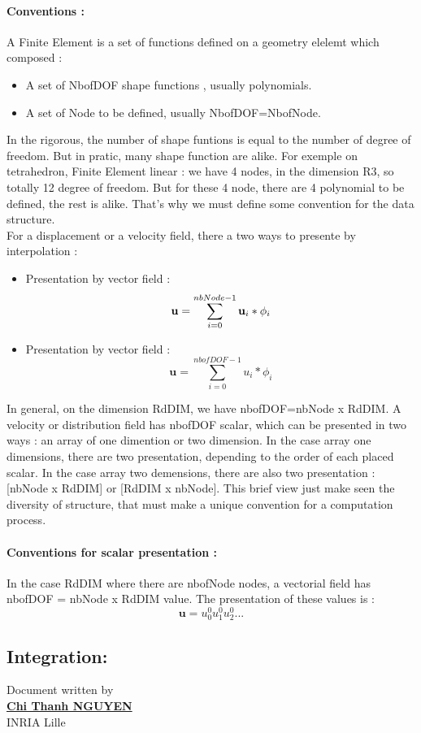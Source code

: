 \documentclass[a4paper,10pt]{article}
\begin{document}
\paragraph{Conventions : } A Finite Element is a set of functions defined on a geometry elelemt which composed :
\begin{itemize}
\item A set of NbofDOF shape functions , usually polynomials.
\item A set of Node to be defined, usually NbofDOF=NbofNode. 
\end{itemize} 
In the rigorous, the number of shape funtions is equal to the number of degree of freedom. But in pratic, many shape function are alike. For exemple on tetrahedron, Finite Element linear : we have 4 nodes, in the dimension R3, so totally 12 degree of freedom. But for these 4 node, there are 4 polynomial to be defined, the rest is alike. That's why we must define some convention for the data structure. \\
For a displacement or a velocity field, there a two ways to presente by interpolation :
\begin{itemize}
\item Presentation by vector field : 
               \[\textbf{u}=\sum_{i=0}^{nbNode-1} \textbf{u}_i * {\bf\phi}_i  \]
\item Presentation by vector field : 
               \[\textbf{u}=\sum_{i=0}^{nbofDOF-1} u_i * \phi_i  \]
\end{itemize} 
In general, on the dimension RdDIM, we have nbofDOF=nbNode x RdDIM. A velocity or distribution field has nbofDOF scalar, which can be presented in two ways : an array of one dimention or two dimension. In the case array one dimensions, there are two presentation, depending to the order of each placed scalar. In the case array two demensions, there are also two presentation :   [nbNode x RdDIM] or [RdDIM x nbNode]. This brief view just make seen the diversity of structure, that must make a unique convention for a computation process. 
\paragraph{Conventions for scalar presentation : }
In the case RdDIM where there are nbofNode nodes, a vectorial field has nbofDOF = nbNode x RdDIM  value. The presentation of these values is :
               \[ \textbf{u}= u_0^0 u_1^0 u_2^0 ...  \]
\subsection{Integration: }

						      \begin{flushright}
						      Document written by \\
						      \href{mailto:chi-thanh.nguyen@inria.fr}{{\textbf {Chi Thanh NGUYEN}}} \\
						      INRIA Lille
						      \end{flushright}
\end{document}
